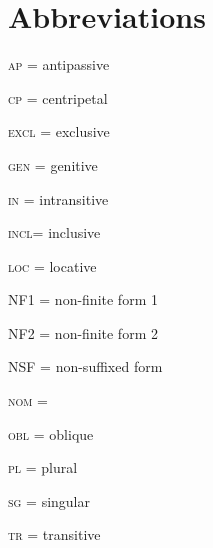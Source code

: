 \documentclass[output=paper
,newtxmath
,modfonts
,nonflat]{langsci/langscibook}
\begin{document}
\section*{Abbreviations}
\begin{multicols}{2}

\textsc{ap} = antipassive

\textsc{cp} = centripetal 

\textsc{excl} = exclusive

\textsc{gen} = genitive

\textsc{in} = intransitive

\textsc{incl}= inclusive

\textsc{loc} = locative

NF1 = non-finite form 1

NF2 = non-finite form 2

NSF = non-suffixed form

\textsc{nom} = 

\textsc{obl} = oblique

\textsc{pl} = plural

\textsc{sg} = singular

\textsc{tr} = transitive
\end{multicols}
\end{document}
